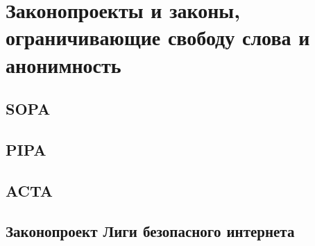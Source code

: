 \chapter{Законопроекты и законы, ограничивающие свободу слова и анонимность}
\section{SOPA}
\section{PIPA}
\section{ACTA}
\section{Законопроект Лиги безопасного интернета}
